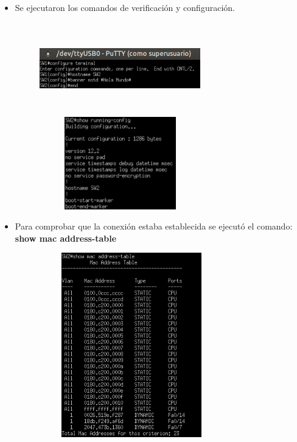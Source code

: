 {\begin{itemize}
        \item Se ejecutaron los comandos de verificaci\'on y configuraci\'on.
        \begin{figure}[h]
            \hspace{1cm}
            \includegraphics[width=7cm, height=4cm]{./imagenes/terminal_1.png}
            \hspace{0.5cm}
            \includegraphics[width=7cm, height=4cm]{./imagenes/terminal_2.png}
        \end{figure}
        
        \newpage %
        \item Para comprobar que la conexi\'on estaba establecida se ejecut\'o el comando: \textbf{show mac address-table}
        \begin{figure}[h]
            \hspace{4cm}
            \includegraphics[width=8cm, height=8cm]{./imagenes/terminal_3.png}
        \end{figure}
    \end{itemize}
    
}
